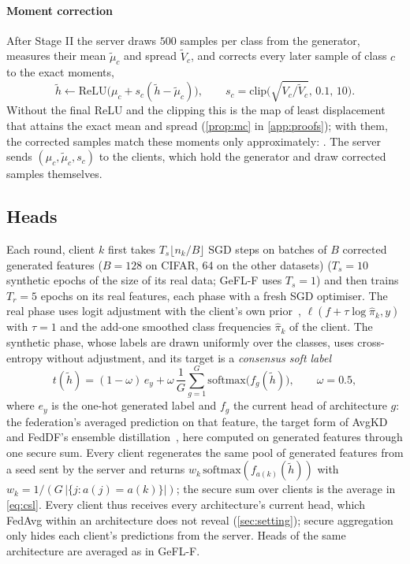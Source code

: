 \paragraph{Moment correction} After Stage II the server draws $500$ samples per class from the generator, measures
their mean $\tilde\mu_c$ and spread $\tilde V_c$, and corrects every later sample of class $c$ to the exact moments,
\begin{equation}\label{eq:mc}
\tilde h\leftarrow\mathrm{ReLU}\big(\mu_c+s_c(\tilde h-\tilde\mu_c)\big),\qquad s_c=\mathrm{clip}\Big(\sqrt{V_c/\tilde V_c},\,0.1,\,10\Big).
\end{equation}
Without the final ReLU and the clipping this is the map of least displacement that attains the exact mean and spread
(\cref{prop:mc} in \cref{app:proofs}); with them, the corrected samples match these moments only approximately:
. The server sends $(\mu_c,\tilde\mu_c,s_c)$ to the clients, which hold the generator and
draw corrected samples themselves.

\subsection{Heads}\label{sec:method-heads}

Each round, client $k$ first takes $T_s\lfloor n_k/B\rfloor$ SGD steps on batches of $B$ corrected generated features ($B=128$ on CIFAR, 64 on the other datasets)
($T_s=10$ synthetic epochs of the size of its real data; GeFL-F uses $T_s=1$) and then trains $T_r=5$ epochs on its
real features, each phase with a fresh SGD optimiser. The real phase uses logit adjustment with the client's own prior~\cite{menon2021la},
$\ell(f+\tau\log\hat\pi_k,y)$ with $\tau=1$ and the add-one smoothed class frequencies $\hat\pi_k$ of the client. The
synthetic phase, whose labels are drawn uniformly over the classes, uses cross-entropy without adjustment, and its
target is a \emph{consensus soft label}
\begin{equation}\label{eq:csl}
t(\tilde h)=(1-\omega)\,e_y+\omega\,\frac1G\sum_{g=1}^G\mathrm{softmax}\big(f_g(\tilde h)\big),\qquad \omega=0.5,
\end{equation}
where $e_y$ is the one-hot generated label and $f_g$ the current head of architecture $g$: the federation's averaged
prediction on that feature, the target form of AvgKD~\cite{afonin2022avgkd} and FedDF's ensemble
distillation~\cite{lin2020feddf}, here computed on generated features through one secure sum. Every client regenerates the same pool of generated features from a
seed sent by the server and returns $w_k\,\mathrm{softmax}(f_{a(k)}(\tilde h))$ with $w_k=1/(G\,|\{j:a(j)=a(k)\}|)$; the
secure sum over clients is the average in \cref{eq:csl}. Every client thus receives every architecture's current
head, which FedAvg within an architecture does not reveal (\cref{sec:setting}); secure aggregation only hides each
client's predictions from the server. Heads of
the same architecture are averaged as in GeFL-F.

